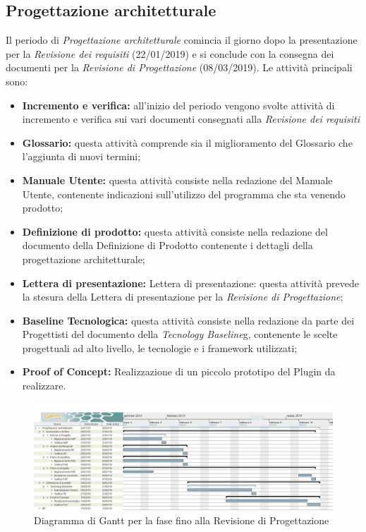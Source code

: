 \subsection{Progettazione architetturale}
Il periodo di \textit{Progettazione architetturale} comincia il giorno dopo la presentazione per la \textit{Revisione dei requisiti} (22/01/2019) e si conclude con la consegna dei documenti per la \textit{Revisione di Progettazione} (08/03/2019). Le attività principali sono:
\begin{itemize}
	\item\textbf{Incremento e verifica:} all'inizio del periodo vengono svolte attività di incremento e verifica sui vari documenti consegnati alla \textit{Revisione dei requisiti}
	\item\textbf{Glossario:} questa attività comprende sia il miglioramento del Glossario che l’aggiunta di nuovi termini;
	\item\textbf{Manuale Utente:}  questa attività consiste nella redazione del Manuale Utente, contenente indicazioni sull’utilizzo del programma che sta venendo prodotto;
	\item\textbf{Definizione di prodotto:} questa attività consiste nella redazione del documento della Definizione di Prodotto contenente i dettagli della progettazione architetturale;
	\item\textbf{Lettera di presentazione:} Lettera di presentazione: questa attività prevede la stesura della Lettera di presentazione per la \textit{Revisione di Progettazione};
	\item\textbf{Baseline Tecnologica:} questa attività consiste nella redazione da parte dei Progettisti del documento della \textit{Tecnology Baseline}\ped g, contenente le scelte progettuali ad alto livello, le tecnologie e i framework utilizzati;
	\item \textbf{Proof of Concept:} Realizzazione di un piccolo prototipo del Plugin da realizzare.
\end{itemize}

\begin{figure}[h!]
	\centering
	\includegraphics[width=\textwidth]{Gantt_seconda_fase.jpg}
	\caption{Diagramma di Gantt per la fase fino alla Revisione di Progettazione}
\end{figure}

